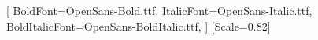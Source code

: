 %
%

\setmainfont{OpenSans-Regular.ttf}[
  BoldFont=OpenSans-Bold.ttf,
  ItalicFont=OpenSans-Italic.ttf,
  BoldItalicFont=OpenSans-BoldItalic.ttf,
]
\setmonofont{DejaVu Sans Mono}[Scale=0.82]

\usepackage[letterpaper,left=1in,right=1in,top=1in,bottom=1in,
            headsep=14pt,footskip=30pt]{geometry}
\usepackage{setspace}

